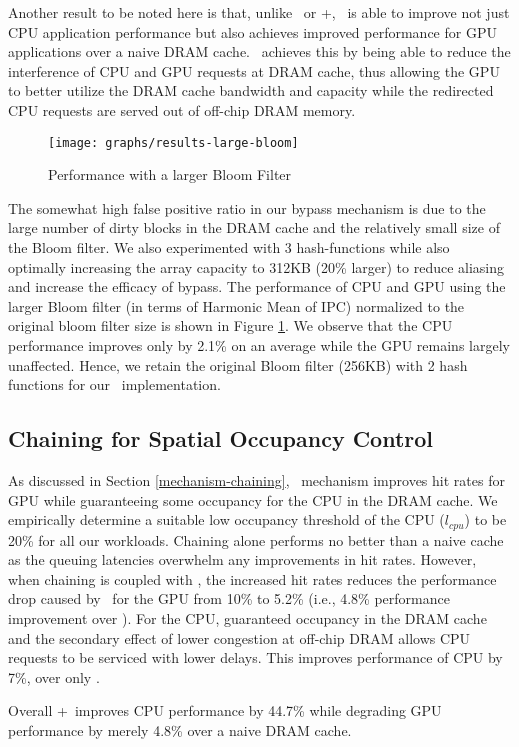 \par Another result to be noted here is that, unlike \prioname\ or \prioname+\bypassname, \bypassname\ is able to improve not just CPU application performance but also achieves improved performance for GPU applications over a naive DRAM cache. \bypassname\ achieves this by being able to reduce the interference of CPU and GPU requests at DRAM cache, thus allowing the GPU to better utilize the DRAM cache bandwidth and capacity while the redirected CPU requests are served out of off-chip DRAM memory.

\begin{figure}[htb]
	\centering
	\texttt{[image: graphs/results-large-bloom]}
	\caption{Performance with a larger Bloom Filter}
	\label{large-bloom}
\end{figure}

\par The somewhat high false positive ratio in our bypass mechanism is due to the large number of dirty blocks in the DRAM cache and the relatively small size of the Bloom filter.  We also experimented with 3 hash-functions while also optimally increasing the array capacity to 312KB (20\% larger) to reduce aliasing and increase the efficacy of bypass. The performance of CPU and GPU using the larger Bloom filter (in terms of Harmonic Mean of IPC) normalized to the original bloom filter size is shown in Figure \ref{large-bloom}. We observe that the CPU performance improves only by 2.1\% on an average while the GPU remains largely unaffected. Hence, we retain the original Bloom filter (256KB) with 2 hash functions for our \bypassname\ implementation.

\subsection{Chaining for Spatial Occupancy Control}
As discussed in Section \ref{mechanism-chaining}, \chaining\ mechanism improves hit rates for GPU while guaranteeing some occupancy for the CPU in the DRAM cache. We empirically determine a suitable low occupancy threshold of the CPU (\textit{$l_{cpu}$}) to be 20\% for all our workloads. Chaining alone performs no better than a naive cache as the queuing latencies overwhelm any improvements in hit rates. However, when chaining is coupled with \prioname, the increased hit rates reduces the performance drop caused by \prioname\ for the GPU from 10\% to 5.2\% (i.e., 4.8\% performance improvement over \prioname). For the CPU, guaranteed occupancy in the DRAM cache and the secondary effect of lower congestion at off-chip DRAM allows CPU requests to be serviced with lower delays. This improves performance of CPU by 7\%, over only \prioname.
\par Overall \chaining+\prioname\ improves CPU performance by 44.7\% while degrading GPU performance by merely 4.8\% over a naive DRAM cache.

